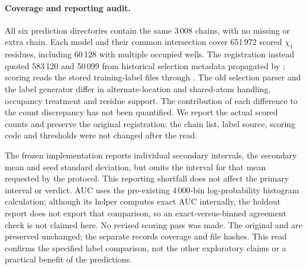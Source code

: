 \documentclass[10pt,a4paper]{article}
\begin{document}
\begin{table}[!htbp]
\centering
\caption{The preregistered holdout read. Differences are occupancy minus single-state;
intervals are 95\% paired component-bootstrap intervals (20\,000 draws). The final row
is the mean over the three fixed seeds, not an ensemble prediction. Seed standard
deviations are 0.0004 for the AUC difference and 0.0029 for the ranking difference.
The frozen scorer did not output a secondary-mean interval; none is inferred from the
individual intervals.}
\label{tab:holdout}
\small\setlength{\tabcolsep}{4pt}

\end{table}

\paragraph{Coverage and reporting audit.} All six prediction directories contain the
same 3\,008 chains, with no missing or extra chain. Each model and their common
intersection cover 651\,972 scored $\chi_1$ residues, including 60\,128 with multiple
occupied wells. The registration instead quoted 583\,120 and 50\,099 from historical
selection metadata propagated by ; scoring reads the
stored training-label files through .
The old selection parser and the label generator differ in alternate-location and
shared-atom handling, occupancy treatment and residue support. The contribution of
each difference to the count discrepancy has not been quantified. We report the actual
scored counts and preserve the original registration: the chain list, label source,
scoring code and thresholds were not changed after the read.

The frozen implementation reports individual secondary intervals, the secondary mean
and seed standard deviation, but omits the interval for that mean requested by the
protocol. This reporting shortfall does not affect the primary interval or verdict.
AUC uses the pre-existing 4\,000-bin log-probability histogram calculation; although its
helper computes exact AUC internally, the holdout report does not export that
comparison, so an exact-versus-binned agreement check is not claimed here. No revised
scoring pass was made. The original  and
 are preserved unchanged; the separate
 records coverage and file hashes.
This read confirms the specified label comparison, not the other exploratory claims
or a practical benefit of the predictions.
\end{document}

